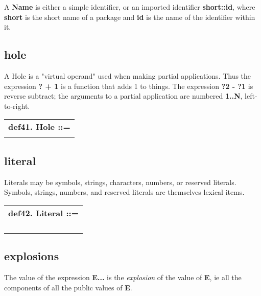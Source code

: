 \documentclass{report}
\begin{document}
A {\bf Name} is either a simple identifier, or an imported identifier
{\bf short::id}, where {\bf short} is the short name of a package and {\bf id} is
the name of the identifier within it.\subsection{hole}


A Hole is a "virtual operand" used when making partial applications.
Thus the expression {\bf ? + 1} is a function that adds 1 to things. The
expression {\bf ?2 - ?1} is reverse subtract; the arguments to a partial
application are numbered {\bf 1..N}, left-to-right.

\begin{tabular}{l}
{\bf def41. Hole ::= }\\ 
\hspace*{3mm}{\tt "?" {[}(Integer){]}} \\ 
\end{tabular}

\subsection{literal}


Literals may be symbols, strings, characters, numbers, or reserved
literals. Symbols, strings, numbers, and reserved literals are
themselves lexical items.

\begin{tabular}{l}
{\bf def42. Literal ::= }\\ 
\hspace*{3mm}{\tt StringLiteral} \\ 
\hspace*{3mm}{\tt  $\mid$ NumberLiteral} \\ 
\hspace*{3mm}{\tt  $\mid$ ReservedLiteral} \\ 
\hspace*{3mm}{\tt  $\mid$ CharacterLiteral} \\ 
\end{tabular}

\subsection{explosions}


The value of the expression {\bf E...} is the {\em explosion} of the value of {\bf E}, ie
all the components of all the public values of {\bf E}.
\end{document}
